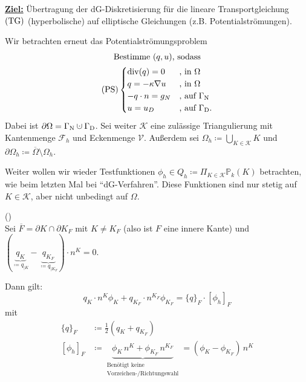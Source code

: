 
\underline{\textbf{Ziel:}} Übertragung der dG-Diskretisierung für die lineare Transportgleichung $ \operatorname{(TG)} $ (hyperbolische) auf elliptische Gleichungen (z.B. Potentialströmungen).

Wir betrachten erneut das Potentialströmungsproblem
\begin{gather*}
	\text{Bestimme } (q, u) \text{, sodass}\\
	\operatorname{(PS)} \begin{cases}
		\operatorname{div}(q) = 0 &\text{, in }\Omega\\
		q = - \kappa \nabla u &\text{, in } \Omega\\
		-q \cdot n = g_N &\text{, auf }\Gamma_{\text{N}}  \\
		u = u_D &\text{, auf } \Gamma_{\text{D}}. 
	\end{cases}
\end{gather*}
Dabei ist $ \partial \Omega = \GammaN \cupdot \GammaD $. Sei weiter $ \mathcal{K} $ eine zulässige Triangulierung mit Kantenmenge $ \mathcal{F}_h $ und Eckenmenge $ \mathcal{V} $. Außerdem sei $ \Omega_h \coloneqq \bigcup_{K \in \mathcal{K}} K$ und $ \partial \Omega_h \coloneqq \overline{\Omega} \setminus \Omega_h $.

Weiter wollen wir wieder Testfunktionen $ \phi_h \in Q_h \coloneqq \Pi_{K \in \mathcal{K}} \mathbb{P}_k(K)$ betrachten, wie beim letzten Mal bei \enquote{dG-Verfahren}. Diese Funktionen sind nur stetig auf $ K \in \mathcal{K} $, aber nicht unbedingt auf $ \Omega $. 


\begin{Satz}()\\
	Sei $ \overline{F} = \partial K \cap \partial K_F $ mit $ K \ne K_F $ (also ist $ F $ eine innere Kante) und $ ( \underbrace{q_{K} }_{\coloneqq q_{|K}}- \underbrace{q_{K_F}}_{\coloneqq q_{|K_F}} )  \cdot n^K = 0$.
	
	Dann gilt:
	\[ q_K \cdot n^K \phi_K + q_{K_F} \cdot n^{K_F} \phi_{K_F} = \{q\}_F \cdot [\phi_h]_F \]
	mit
	\begin{align*}
		\{q\}_F &\coloneqq \frac{1}{2} (q_K + q_{K_F})\\
		[\phi_h]_F &\coloneqq \underbrace{\phi_K \, n^K + \phi_{K_F} \, n^{K_F}}_{\substack{\text{Benötigt keine}\\ \text{Vorzeichen-/Richtungswahl}}} = (\phi_K - \phi_{K_F}) \, n^K
	\end{align*}
\end{Satz}

